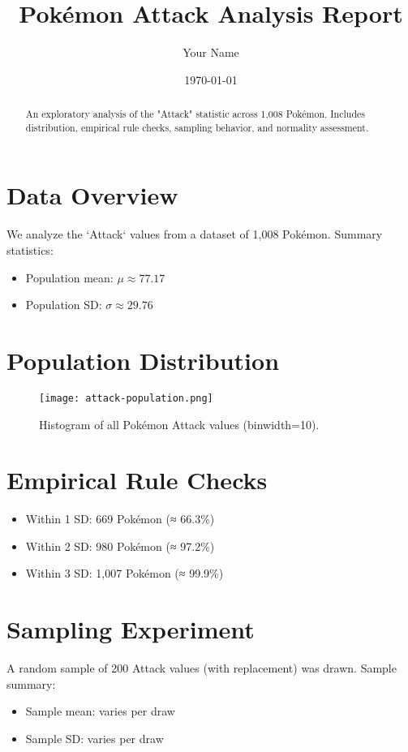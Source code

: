 \documentclass[11pt]{article}
\title{Pokémon Attack Analysis Report}
\author{Your Name}
\date{\today}
\begin{document}
\maketitle

\begin{abstract}
An exploratory analysis of the "Attack" statistic across 1,008 Pokémon.  
Includes distribution, empirical rule checks, sampling behavior, and normality assessment.
\end{abstract}

\section{Data Overview}
We analyze the `Attack` values from a dataset of 1,008 Pokémon.  
Summary statistics:
\begin{itemize}
  \item Population mean: \(\mu \approx 77.17\)  
  \item Population SD: \(\sigma \approx 29.76\)  
\end{itemize}

\section{Population Distribution}
\begin{figure}[h!]
  \centering
  \texttt{[image: attack-population.png]}
  \caption{Histogram of all Pokémon Attack values (binwidth=10).}
\end{figure}

\section{Empirical Rule Checks}
\begin{itemize}
  \item Within 1 SD: 669 Pokémon (≈ 66.3\%)  
  \item Within 2 SD: 980 Pokémon (≈ 97.2\%)  
  \item Within 3 SD: 1,007 Pokémon (≈ 99.9\%)  
\end{itemize}

\section{Sampling Experiment}
A random sample of 200 Attack values (with replacement) was drawn.  
Sample summary:
\begin{itemize}
  \item Sample mean: varies per draw  
  \item Sample SD: varies per draw  
\end{itemize}
\end{document}
